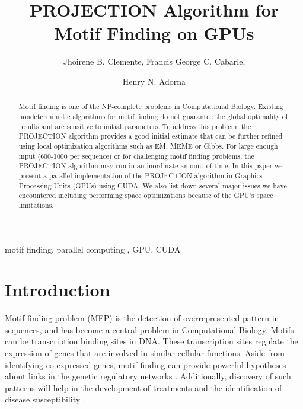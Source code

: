 \documentclass{llncs}
\title{PROJECTION Algorithm for Motif Finding on GPUs}
\author{Jhoirene B. Clemente, Francis George C. Cabarle, \and Henry N. Adorna}
\institute{Algorithms \& Complexity Lab\\
Department of Computer Science\\
University of the Philippines Diliman\\
sDiliman 1101 Quezon City, Philippines\\
E-mail: \tt{\{jbclemente, fccabarle, hnadorna\}@up.edu.ph } }
\newenvironment{keywords}{
       \list{}{\advance\topsep by0.35cm\relax\small
       \leftmargin=1cm
       \labelwidth=0.35cm
       \listparindent=0.35cm
       \itemindent\listparindent
       \rightmargin\leftmargin}\item[\hskip\labelsep
                                     \bfseries Keywords:]}
     {\endlist}
\begin{document}
	
\maketitle

\begin{abstract}
Motif finding is one of the NP-complete problems in Computational Biology. Existing nondeterministic algorithms for motif finding do not guarantee the global optimality of results and are sensitive to initial parameters. To address this problem, the PROJECTION algorithm provides a good initial estimate that can be  further refined using local optimization algorithms such as EM, MEME or Gibbs. For large enough input (600-1000  per sequence) or for challenging motif finding problems, the PROJECTION algorithm may run  in an inordinate amount of time. In this paper we present a parallel implementation of the PROJECTION algorithm in  Graphics Processing Units (GPUs) using CUDA. We also list down several major issues we have encountered including  performing  space optimizations because of the GPU's space limitations.
\end{abstract}
\begin{keywords}
motif finding, parallel computing , GPU, CUDA
\end{keywords}
		
\section{Introduction}\label{intro}


Motif finding problem (MFP) is the detection of overrepresented pattern  in sequences, and has become  a central problem in Computational Biology. Motifs can be transcription binding sites in DNA. These transcription sites regulate the expression of genes that are involved in similar cellular functions. Aside from identifying co-expressed genes,  motif finding can provide powerful hypotheses about links in the genetic regulatory networks \cite{manson}. Additionally, discovery of such patterns will help in the development of treatments and the identification of disease susceptibility \cite{shashidhara}.
\end{document}
